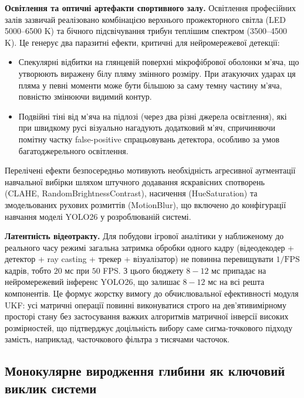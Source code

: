 \textbf{Освітлення та оптичні артефакти спортивного залу.} Освітлення професійних залів
зазвичай реалізовано комбінацією верхнього прожекторного світла (LED 5000--6500 K) та
бічного підсвічування трибун теплішим спектром (3500--4500 K). Це генерує два паразитні
ефекти, критичні для нейромережевої детекції:
\begin{itemize}
    \item Спекулярні відбитки на глянцевій поверхні мікрофібрової оболонки м'яча, що
    утворюють виражену білу пляму змінного розміру. При атакуючих ударах ця пляма у
    певні моменти може бути більшою за саму темну частину м'яча, повністю змінюючи
    видимий контур.
    \item Подвійні тіні від м'яча на підлозі (через два різні джерела освітлення),
    які при швидкому русі візуально нагадують додатковий м'яч, спричиняючи помітну частку
    false-positive спрацьовувань детектора, особливо за умов багатоджерельного освітлення.
\end{itemize}

Перелічені ефекти безпосередньо мотивують необхідність агресивної аугментації навчальної
вибірки шляхом штучного додавання яскравісних спотворень (CLAHE, RandomBrightnessContrast),
насичення (HueSaturation) та змодельованих рухових розмиттів (MotionBlur), що включено
до конфігурації навчання моделі YOLO26 у розроблюваній системі.

\textbf{Латентність відеотракту.} Для побудови ігрової аналітики у наближеному до реального
часу режимі загальна затримка обробки одного кадру (відеодекодер + детектор + ray casting
+ трекер + візуалізатор) не повинна перевищувати $1/\text{FPS}$ кадрів, тобто $20$ мс при
$50$ FPS. З цього бюджету $8-12$ мс припадає на нейромережевий інференс YOLO26, що
залишає $8-12$ мс на всі решта компонентів. Це формує жорстку вимогу до обчислювальної
ефективності модуля \gls{UKF}: усі матричні операції повинні виконуватися строго на
дев'ятивимірному просторі стану без застосування важких алгоритмів матричної інверсії
високих розмірностей, що
підтверджує доцільність вибору саме сигма-точкового підходу замість, наприклад,
часточкового фільтра з тисячами часточок.

\subsection{Монокулярне виродження глибини як ключовий виклик системи}


